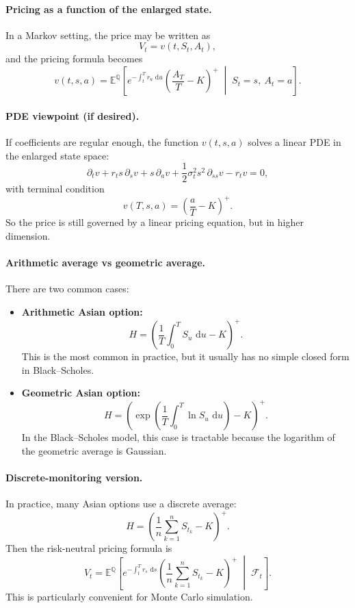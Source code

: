 \documentclass[11pt]{article}
\newcommand{\Qbb}{\mathbb{Q}}
\newcommand{\E}{\mathbb{E}}
\newcommand{\dd}{\,\mathrm{d}}
\newcommand{\1}{\mathbf{1}}
\begin{document}
\paragraph{Pricing as a function of the enlarged state.}
In a Markov setting, the price may be written as
\[
V_t=v(t,S_t,A_t),
\]
and the pricing formula becomes
\[
v(t,s,a)
=
\E^{\Qbb}\!\left[
e^{-\int_t^T r_u\,\dd u}
\left(\frac{A_T}{T}-K\right)^+
\;\middle|\;
S_t=s,\ A_t=a
\right].
\]

\paragraph{PDE viewpoint (if desired).}
If coefficients are regular enough, the function \(v(t,s,a)\) solves a linear PDE in the enlarged state space:
\[
\partial_t v
+ r_t s\,\partial_s v
+ s\,\partial_a v
+ \frac12 \sigma_t^2 s^2\,\partial_{ss}v
- r_t v
=0,
\]
with terminal condition
\[
v(T,s,a)=\left(\frac{a}{T}-K\right)^+.
\]
So the price is still governed by a linear pricing equation, but in higher dimension.

\paragraph{Arithmetic average vs geometric average.}
There are two common cases:
\begin{itemize}[leftmargin=1.4em]
    \item \textbf{Arithmetic Asian option:}
    \[
    H=\left(\frac{1}{T}\int_0^T S_u\,\dd u-K\right)^+.
    \]
    This is the most common in practice, but it usually has no simple closed form in Black--Scholes.
    \item \textbf{Geometric Asian option:}
    \[
    H=\left(\exp\!\left(\frac{1}{T}\int_0^T \ln S_u\,\dd u\right)-K\right)^+.
    \]
    In the Black--Scholes model, this case is tractable because the logarithm of the geometric average is Gaussian.
\end{itemize}

\paragraph{Discrete-monitoring version.}
In practice, many Asian options use a discrete average:
\[
H=\left(\frac{1}{n}\sum_{k=1}^n S_{t_k}-K\right)^+.
\]
Then the risk-neutral pricing formula is
\[
V_t
=
\E^{\Qbb}\!\left[
e^{-\int_t^T r_s\,\dd s}
\left(\frac{1}{n}\sum_{k=1}^n S_{t_k}-K\right)^+
\;\middle|\;
\mathcal F_t
\right].
\]
This is particularly convenient for Monte Carlo simulation.
\end{document}
